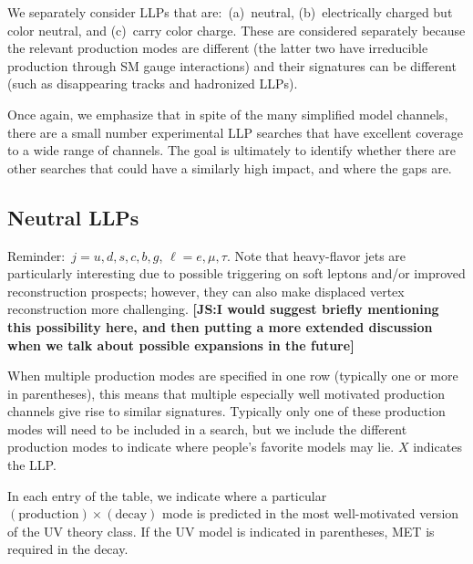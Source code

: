 We separately consider LLPs that are:~(a)~neutral, (b)~electrically charged but color neutral, and (c)~carry color charge. These are considered separately because the relevant production modes are different (the latter two have irreducible production through SM gauge interactions) and their signatures can be different (such as disappearing tracks and hadronized LLPs).

Once again, we emphasize that in spite of the many simplified model channels, there are a small number experimental LLP searches that have excellent coverage to a wide range of channels. The goal is ultimately to identify whether there are other searches that could have a similarly high impact, and where the gaps are.

\subsection{Neutral LLPs}

Reminder:~$j=u,d,s,c,b,g$, $\ell=e,\mu,\tau$. Note that heavy-flavor jets are particularly interesting due to possible triggering on soft leptons and/or improved reconstruction prospects; however, they can also make displaced vertex reconstruction more challenging. {\bf [JS:I would suggest briefly mentioning this possibility here, and then putting a more extended discussion when we talk about possible expansions in the future]}

When multiple production modes are specified in one row (typically one or more in parentheses), this means that multiple especially well motivated production channels give rise to similar signatures. Typically only one of these production modes will need to be included in a search, but we include the different production modes to indicate where people's favorite models may lie. $X$ indicates the LLP.

In each entry of the table, we indicate where a particular $(\mathrm{production})\times(\mathrm{decay})$ mode is predicted in the most well-motivated version of the UV theory class. If the UV model is indicated in parentheses, MET is required in the decay.

